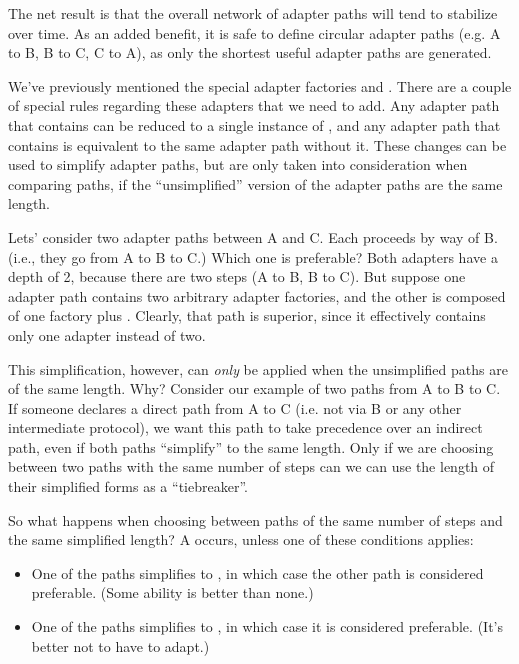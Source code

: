\begin{verbatim%
}
\begin{verbatim%
}
\begin{verbatim%
}
\begin{verbatim%
}
\begin{verbatim%
}
\begin{verbatim%
}
The net result is that the overall network of adapter paths will tend to
stabilize over time.  As an added benefit, it is safe to define circular
adapter paths (e.g. A to B, B to C, C to A), as only the shortest useful
adapter paths are generated.



We've previously mentioned the special adapter factories
 and .  There are a
couple of special rules regarding these adapters that we need to add.  Any
adapter path that contains  can be reduced to a
single instance of , and any adapter path that
contains  is equivalent to the same adapter path
without it. These changes can be used to simplify adapter paths, but are only
taken into consideration when comparing paths, if the ``unsimplified'' version
of the adapter paths are the same length.

Lets' consider two adapter paths between A and C.  Each proceeds by way of B.
(i.e., they go from A to B to C.)  Which one is preferable?  Both
adapters have a depth of 2, because there are two steps (A to B, B to C).  But
suppose one adapter path contains two arbitrary adapter factories, and the
other is composed of one factory plus .  Clearly,
that path is superior, since it effectively contains only one adapter instead
of two.

This simplification, however, can \emph{only} be applied when the unsimplified
paths are of the same length.  Why?  Consider our example of two paths from A
to B to C.  If someone declares a direct path from A to C (i.e. not via B or
any other intermediate protocol), we want this path to take precedence over an
indirect path, even if both paths ``simplify'' to the same length.  Only if we
are choosing between two paths with the same number of steps can we can use the
length of their simplified forms as a ``tiebreaker''.

So what happens when choosing between paths of the same number of steps and the
same simplified length?  A  occurs, unless one of these
conditions applies:

\begin{itemize}
\item One of the paths simplifies to , in which case
the other path is considered preferable.  (Some ability is better than none.)

\item One of the paths simplifies to , in which
case it is considered preferable.  (It's better not to have to adapt.)


\end{itemize}
\end{verbatim%
}
\end{verbatim%
}
\end{verbatim%
}
\end{verbatim%
}
\end{verbatim%
}
\end{verbatim%
}

